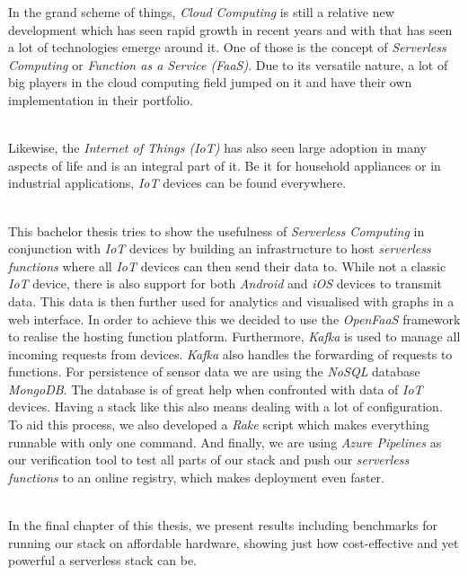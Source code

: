 In the grand scheme of things, \textit{Cloud Computing} is still a relative new development which
has seen rapid growth in recent years and with that has seen a lot of technologies emerge around it.
One of those is the concept of \textit{Serverless Computing} or \textit{Function as a Service
(FaaS)}. Due to its versatile nature, a lot of big players in the cloud computing field jumped on it
and have their own implementation in their portfolio.

\\

Likewise, the \textit{Internet of Things (IoT)} has also seen large adoption in many aspects of life
and is an integral part of it. Be it for household appliances or in industrial applications,
\textit{IoT} devices can be found everywhere.

\\

This bachelor thesis tries to show the usefulness of \textit{Serverless Computing} in conjunction
with \textit{IoT} devices by building an infrastructure to host \textit{serverless functions} where
all \textit{IoT} devices can then send their data to. While not a classic \textit{IoT} device, there
is also support for both \textit{Android} and \textit{iOS} devices to transmit data. This data is
then further used for analytics and visualised with graphs in a web interface. In order to achieve
this we decided to use the \textit{OpenFaaS} framework to realise the hosting function platform.
Furthermore, \textit{Kafka} is used to manage all incoming requests from devices. \textit{Kafka}
also handles the forwarding of requests to functions. For persistence of sensor data we are using
the \textit{NoSQL} database \textit{MongoDB}. The database is of great help when confronted with
data of \textit{IoT} devices. Having a stack like this also means dealing with a lot of
configuration. To aid this process, we also developed a \textit{Rake} script which makes everything
runnable with only one command. And finally, we are using \textit{Azure Pipelines} as our
verification tool to test all parts of our stack and push our \textit{serverless functions} to an
online registry, which makes deployment even faster.

\\

In the final chapter of this thesis, we present results including benchmarks for running our stack
on affordable hardware, showing just how cost-effective and yet powerful a serverless stack can be.
